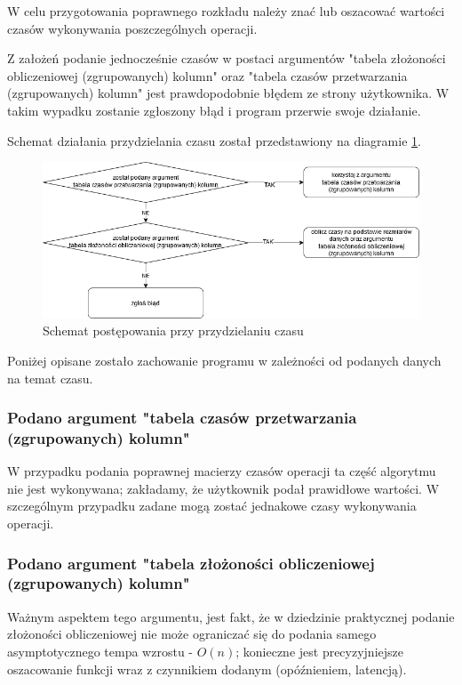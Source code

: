 \documentclass[brudnopis]{xmgr}
\begin{document}
W celu przygotowania poprawnego rozkładu należy znać lub oszacować wartości czasów wykonywania poszczególnych operacji.\medskip

Z założeń podanie jednocześnie czasów w postaci argumentów "tabela złożoności obliczeniowej (zgrupowanych) kolumn" oraz "tabela czasów przetwarzania (zgrupowanych) kolumn" jest prawdopodobnie błędem ze strony użytkownika. W takim wypadku zostanie zgłoszony błąd i program przerwie swoje działanie.\medskip

Schemat działania przydzielania czasu został przedstawiony na diagramie \ref{diag:time-assign}.

\begin{figure}[!tbh]
\centering
\includegraphics[width=.9\hsize]{fig/przydzielanie_czasow.png}
\caption{Schemat postępowania przy przydzielaniu czasu\label{diag:time-assign}}
\end{figure}
\medskip

Poniżej opisane zostało zachowanie programu w zależności od podanych danych na temat czasu.

\subsubsection{Podano argument "tabela czasów przetwarzania (zgrupowanych) kolumn"}

W przypadku podania poprawnej macierzy czasów operacji ta część algorytmu nie jest wykonywana; zakładamy, że użytkownik podał prawidłowe wartości.
W szczególnym przypadku zadane mogą zostać jednakowe czasy wykonywania operacji.

\subsubsection{Podano argument "tabela złożoności obliczeniowej (zgrupowanych) kolumn"}

Ważnym aspektem tego argumentu, jest fakt, że w dziedzinie praktycznej podanie złożoności obliczeniowej nie może ograniczać się do podania samego asymptotycznego tempa wzrostu - $O(n)$; konieczne jest precyzyjniejsze oszacowanie funkcji wraz z czynnikiem dodanym (opóźnieniem, latencją).
\medskip
\end{document}
